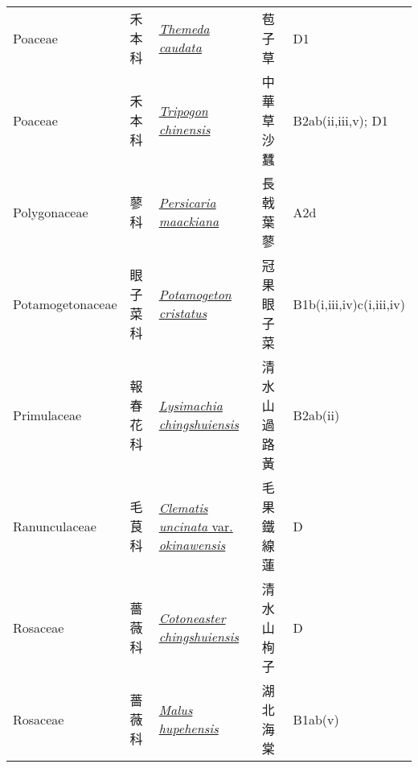 {\begin{longtable}{L{2.5cm}L{2cm}L{5cm}L{2.5cm}L{3cm}}
    Poaceae & 禾本科 & \href{http://www.theplantlist.org/tpl1.1/search?q=Themeda+caudata}{\textit{Themeda caudata} } & 苞子草 & D1    \\
    Poaceae & 禾本科 & \href{http://www.theplantlist.org/tpl1.1/search?q=Tripogon+chinensis}{\textit{Tripogon chinensis} } & 中華草沙蠶 & B2ab(ii,iii,v); D1    \\
    Polygonaceae & 蓼科 & \href{http://www.theplantlist.org/tpl1.1/search?q=Persicaria+maackiana}{\textit{Persicaria maackiana} } & 長戟葉蓼 & A2d    \\
    Potamogetonaceae & 眼子菜科 & \href{http://www.theplantlist.org/tpl1.1/search?q=Potamogeton+cristatus}{\textit{Potamogeton cristatus} } & 冠果眼子菜 & B1b(i,iii,iv)c(i,iii,iv)    \\
    Primulaceae & 報春花科 & \href{http://www.theplantlist.org/tpl1.1/search?q=Lysimachia+chingshuiensis}{\textit{Lysimachia chingshuiensis} } & 清水山過路黃 & B2ab(ii)    \\
    Ranunculaceae & 毛茛科 & \href{http://www.theplantlist.org/tpl1.1/search?q=Clematis+uncinata+var.+okinawensis}{\textit{Clematis uncinata} var. \textit{okinawensis} } & 毛果鐵線蓮 & D    \\
    Rosaceae & 薔薇科 & \href{http://www.theplantlist.org/tpl1.1/search?q=Cotoneaster+chingshuiensis}{\textit{Cotoneaster chingshuiensis} } & 清水山栒子 & D    \\
    Rosaceae & 薔薇科 & \href{http://www.theplantlist.org/tpl1.1/search?q=Malus+hupehensis}{\textit{Malus hupehensis} } & 湖北海棠 & B1ab(v)    \\

\end{longtable}}
